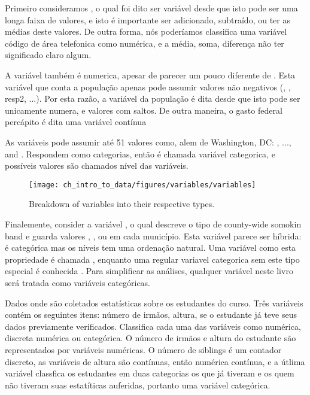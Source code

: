 Primeiro consideramos , o qual foi dito ser variável  desde que isto pode ser uma longa faixa de valores, e isto é importante ser adicionado, subtraído, ou ter as médias deste valores. De outra forma, nós poderíamos classifica uma variável código de área telefonica como numérica, e a média, soma, diferença não ter significado claro algum.

A variável  também é numerica, apesar de parecer um pouco diferente de . Esta variável que conta a população apenas pode assumir valores não negativos (, , resp{2}, ...). Por esta razão, a variável da população é dita  desde que isto pode ser unicamente numera, e valores com saltos. De outra maneira, o gasto federal percápito é dita uma variável contínua 

As variáveis  pode assumir até 51 valores como, alem de Washington, DC:  , ..., and . Respondem como categorias,  então é chamada variável categorica, e possíveis valores são chamados nível das variáveis.

\begin{figure}
\centering
\texttt{[image: ch\_intro\_to\_data/figures/variables/variables]}
\caption{Breakdown of variables into their respective types.}
\label{variables}
\end{figure}

Finalemente, consider a variável , o qual descreve o tipo de county-wide somokin band e guarda valores , , ou  em cada município. Esta variável parece ser híbrida: é categórica mas os níveis tem uma ordenação natural. Uma variável como esta propriedade é chamada , enquanto uma regular variavel categorica sem este tipo especial é conhecida . Para simplificar as análises, qualquer variável neste livro será tratada como variáveis categóricas. 

\begin{example}{Dados onde são coletados estatísticas sobre os estudantes do curso. Três variáveis contém os seguintes itens: número de irmãos, altura, se o estudante já teve seus dados previamente verificados. Classifica cada uma das variáveis como numérica, discreta numérica ou categórica.}
O número de irmãos e altura do estudante são representados por variáveis numéricas. O número de siblings é um contador discreto, as variáveis de altura são contínuas, então numérica contínua, e a útlima variável classfica os estudantes em duas categorias os que já tiveram e os quem não tiveram suas estatíticas auferidas, portanto uma variável categórica.
\end{example}

